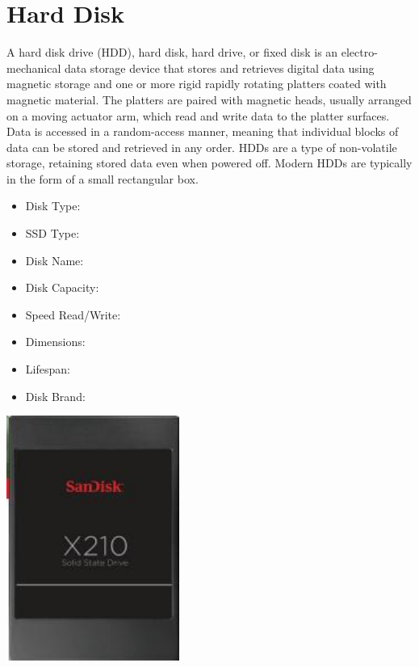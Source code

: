 \documentclass{article}
\begin{document}
\section{Hard Disk}
A hard disk drive (HDD), hard disk, hard drive, or fixed disk is an electro-mechanical data storage device that stores and retrieves digital data using magnetic storage and one or more rigid rapidly rotating platters coated with magnetic material. The platters are paired with magnetic heads, usually arranged on a moving actuator arm, which read and write data to the platter surfaces. Data is accessed in a random-access manner, meaning that individual blocks of data can be stored and retrieved in any order. HDDs are a type of non-volatile storage, retaining stored data even when powered off. Modern HDDs are typically in the form of a small rectangular box.
\begin{itemize}
  \item Disk Type:
  \item SSD Type:
  \item Disk Name:
  \item Disk Capacity:
  \item Speed Read/Write:
  \item Dimensions:
  \item Lifespan:
  \item Disk Brand:
\end{itemize}


\href{https://www.mouser.com/datasheet/2/669/SanDisk_DataSheet_X210_08_06_13-805929.pdf}{\includegraphics[height=8cm]{SSD.jpg}} 
\end{document}
